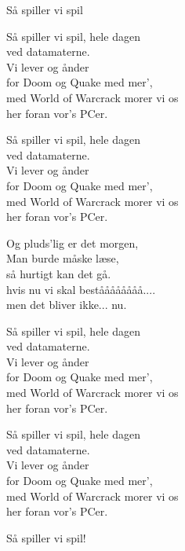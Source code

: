 \begin{song}{Så spiller vi spil}
\begin{SBChorus}
  Så spiller vi spil, hele dagen \\
  ved datamaterne. \\
  Vi lever og ånder \\
  for Doom og Quake med mer', \\
  med World of Warcrack morer vi os \\
  her foran vor's PCer. \\
\end{SBChorus}

\begin{SBChorus}
  Så spiller vi spil, hele dagen \\
  ved datamaterne. \\
  Vi lever og ånder \\
  for Doom og Quake med mer', \\
  med World of Warcrack morer vi os \\
  her foran vor's PCer. \\
\end{SBChorus}

\begin{SBVerse}
  Og pluds'lig er det morgen, \\
  Man burde måske læse, \\
  så hurtigt kan det gå. \\
  hvis nu vi skal beståååååååå.... \\
  men det bliver ikke... nu. \\
\end{SBVerse}
  

\begin{SBChorus}
  Så spiller vi spil, hele dagen \\
  ved datamaterne. \\
  Vi lever og ånder \\
  for Doom og Quake med mer', \\
  med World of Warcrack morer vi os \\
  her foran vor's PCer. \\ \medskip

  Så spiller vi spil, hele dagen \\
  ved datamaterne. \\
  Vi lever og ånder \\
  for Doom og Quake med mer', \\
  med World of Warcrack morer vi os \\
  her foran vor's PCer. \\
\end{SBChorus}
  
  \begin{SBSection*}
    Så spiller vi spil! \\
  \end{SBSection*}
\end{song}